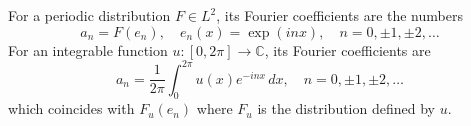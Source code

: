 For a periodic distribution $F \in L^2$, its Fourier coefficients are the numbers
$$a_n = F(e_n), \quad e_n(x) = \exp(inx), \quad n = 0, \pm 1, \pm 2, \ldots$$
For an integrable function $u: [0, 2\pi] \to \mathbb{C}$, its Fourier coefficients are
$$a_n = \frac{1}{2\pi} \int_{0}^{2\pi} u(x) e^{-inx} \, dx, \quad n = 0, \pm 1, \pm 2, \ldots$$
which coincides with $F_u(e_n)$ where $F_u$ is the distribution defined by $u$.
